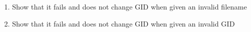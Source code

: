 \documentclass[11pt,letterpaper]{report}
\begin{document}
\begin{enumerate}
\begin{enumerate}
                                                                                                                                                                                                                                                                                                                                                                                                                                                                                                                                                                                                                                                                                                                \item Show that it fails and does not change GID when given an invalid filename
                                                                                                                                                                                                                                                                                                                                                                                                                                                                                                                                                                                                                                                                                                                        \item Show that it fails and does not change GID when given an invalid GID        
                                                                                                                                                                                                                                                                                                                                                                                                                                                                                                                                                                                                                                                                                                                            \end{enumerate}
                                                                                                                                                                                                                                                                                                                                                                                                                                                                                                                                                                                                                                                                                                                            \begin{figure}[h!]

\end{figure}
\end{enumerate}
\end{document}
